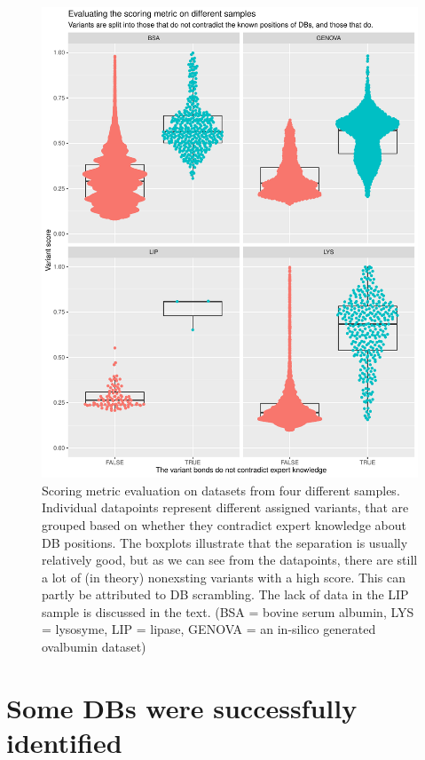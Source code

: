 \begin{figure}
  \centering
  \includegraphics[width=1\linewidth]{img/scoring-metric-evaluation.pdf}
  \caption{Scoring metric evaluation on datasets from four different samples. Individual datapoints represent different assigned variants, that are grouped based on whether they contradict expert knowledge about DB positions. The boxplots illustrate that the separation is usually relatively good, but as we can see from the datapoints, there are still a lot of (in theory) nonexsting variants with a high score. This can partly be attributed to DB scrambling. The lack of data in the LIP sample is discussed in the text. (BSA = bovine serum albumin, LYS = lysosyme, LIP = lipase, GENOVA = an in-silico generated ovalbumin dataset)}\label{fig:scoring-metric}
\end{figure}

\section{Some DBs were successfully identified}

